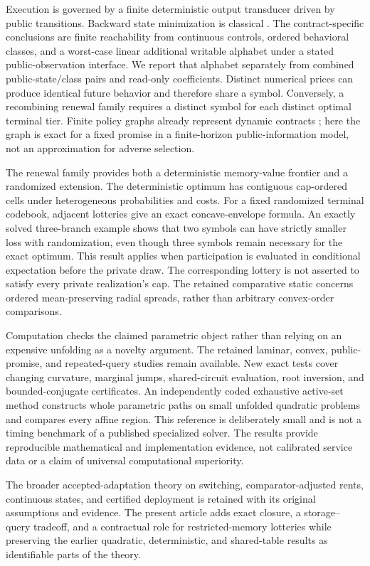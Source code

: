 Execution is governed by a finite deterministic output transducer driven by public transitions. Backward state minimization is classical \citep{BeanBirgeSmith1987,GivanDeanGreig2003,Peyriere2023}. The contract-specific conclusions are finite reachability from continuous controls, ordered behavioral classes, and a worst-case linear additional writable alphabet under a stated public-observation interface. We report that alphabet separately from combined public-state/class pairs and read-only coefficients. Distinct numerical prices can produce identical future behavior and therefore share a symbol. Conversely, a recombining renewal family requires a distinct symbol for each distinct optimal terminal tier. Finite policy graphs already represent dynamic contracts \citep{Zhang2012}; here the graph is exact for a fixed promise in a finite-horizon public-information model, not an approximation for adverse selection.

The renewal family provides both a deterministic memory-value frontier and a randomized extension. The deterministic optimum has contiguous cap-ordered cells under heterogeneous probabilities and costs. For a fixed randomized terminal codebook, adjacent lotteries give an exact concave-envelope formula. An exactly solved three-branch example shows that two symbols can have strictly smaller loss with randomization, even though three symbols remain necessary for the exact optimum. This result applies when participation is evaluated in conditional expectation before the private draw. The corresponding lottery is not asserted to satisfy every private realization's cap. The retained comparative static concerns ordered mean-preserving radial spreads, rather than arbitrary convex-order comparisons.

Computation checks the claimed parametric object rather than relying on an expensive unfolding as a novelty argument. The retained laminar, convex, public-promise, and repeated-query studies remain available. New exact tests cover changing curvature, marginal jumps, shared-circuit evaluation, root inversion, and bounded-conjugate certificates. An independently coded exhaustive active-set method constructs whole parametric paths on small unfolded quadratic problems and compares every affine region. This reference is deliberately small and is not a timing benchmark of a published specialized solver. The results provide reproducible mathematical and implementation evidence, not calibrated service data or a claim of universal computational superiority.

The broader accepted-adaptation theory on switching, comparator-adjusted rents, continuous states, and certified deployment is retained with its original assumptions and evidence. The present article adds exact closure, a storage--query tradeoff, and a contractual role for restricted-memory lotteries while preserving the earlier quadratic, deterministic, and shared-table results as identifiable parts of the theory.
